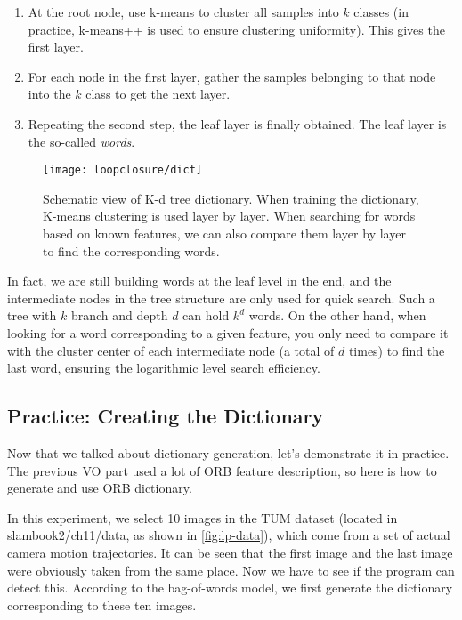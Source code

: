 \begin{mdframed}
	\begin{enumerate}
		\item At the root node, use k-means to cluster all samples into $k$ classes (in practice, k-means++ is used to ensure clustering uniformity). This gives the first layer.
		\item For each node in the first layer, gather the samples belonging to that node into the $k$ class to get the next layer.
		\item Repeating the second step, the leaf layer is finally obtained. The leaf layer is the so-called \textit{words}.
	\end{enumerate}
\end{mdframed}

\begin{figure}[!ht]
	\centering
	\texttt{[image: loopclosure/dict]}
	\caption{Schematic view of K-d tree dictionary. When training the dictionary, K-means clustering is used layer by layer. When searching for words based on known features, we can also compare them layer by layer to find the corresponding words.}
	\label{fig:lp-dict}
\end{figure}

In fact, we are still building words at the leaf level in the end, and the intermediate nodes in the tree structure are only used for quick search. Such a tree with $k$ branch and depth $d$ can hold $k^d$ words. On the other hand, when looking for a word corresponding to a given feature, you only need to compare it with the cluster center of each intermediate node (a total of $d$ times) to find the last word, ensuring the logarithmic level search efficiency.

\subsection{Practice: Creating the Dictionary}
Now that we talked about dictionary generation, let's demonstrate it in practice. The previous VO part used a lot of ORB feature description, so here is how to generate and use ORB dictionary.

In this experiment, we select 10 images in the TUM dataset (located in slambook2/ch11/data, as shown in \autoref{fig:lp-data}), which come from a set of actual camera motion trajectories. It can be seen that the first image and the last image were obviously taken from the same place. Now we have to see if the program can detect this. According to the bag-of-words model, we first generate the dictionary corresponding to these ten images.

